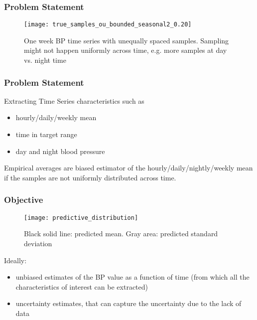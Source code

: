 \documentclass[
	8pt, %
]{beamer}
\begin{document}


\begin{frame}
	\frametitle{Problem Statement}

		\begin{figure}
				\texttt{[image: true\_samples\_ou\_bounded\_seasonal2\_0.20]}
				\caption{One week BP time series with unequally spaced samples. Sampling might not happen
				uniformly across time, e.g. more samples at day vs. night time}
		\end{figure}

\end{frame}


\begin{frame}
	\frametitle{Problem Statement}

		Extracting Time Series characteristics such as
		\begin{itemize}
		\item hourly/daily/weekly mean
		\item time in target range
		\item day and night blood pressure
		\end{itemize}

	\bigskip %

	Empirical averages are biased estimator of the hourly/daily/nightly/weekly mean if
	the samples are not uniformly distributed across time.

\end{frame}


\begin{frame}
	\frametitle{Objective}

		\begin{figure}
				\texttt{[image: predictive\_distribution]}
				\caption{Black solid line: predicted mean. Gray area: predicted standard deviation}
		\end{figure}

	Ideally:
	\begin{itemize}
		\item unbiased estimates of the BP value as a function of time (from which all the
		characteristics of interest can be extracted)
		\item uncertainty estimates, that can capture the uncertainty due to the lack of data
	\end{itemize}
\end{frame}
\end{document}
